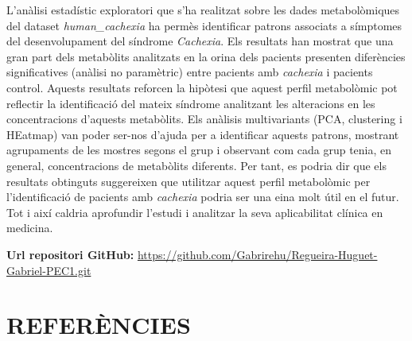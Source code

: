 \documentclass[
]{article}
\begin{document}
L'anàlisi estadístic exploratori que s'ha realitzat sobre les dades
metabolòmiques del dataset \emph{human\_cachexia} ha permès identificar
patrons associats a símptomes del desenvolupament del síndrome
\emph{Cachexia}. Els resultats han mostrat que una gran part dels
metabòlits analitzats en la orina dels pacients presenten diferències
significatives (anàlisi no paramètric) entre pacients amb
\emph{cachexia} i pacients control. Aquests resultats reforcen la
hipòtesi que aquest perfil metabolòmic pot reflectir la identificació
del mateix síndrome analitzant les alteracions en les concentracions
d'aquests metabòlits. Els anàlisis multivariants (PCA, clustering i
HEatmap) van poder ser-nos d'ajuda per a identificar aquests patrons,
mostrant agrupaments de les mostres segons el grup i observant com cada
grup tenia, en general, concentracions de metabòlits diferents. Per
tant, es podria dir que els resultats obtinguts suggereixen que
utilitzar aquest perfil metabolòmic per l'identificació de pacients amb
\emph{cachexia} podria ser una eina molt útil en el futur. Tot i així
caldria aprofundir l'estudi i analitzar la seva aplicabilitat clínica en
medicina.

\textbf{Url repositori GitHub:}
\url{https://github.com/Gabrirehu/Regueira-Huguet-Gabriel-PEC1.git}

\section{REFERÈNCIES}\label{referuxe8ncies}
\end{document}
